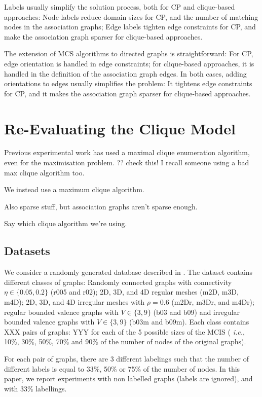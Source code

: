 \documentclass{llncs}
\begin{document}
Labels usually simplify the solution process, both for CP and clique-based approaches: Node labels
reduce domain sizes for CP, and the number of matching nodes in the association graphs; Edge labels
tighten edge constraints for CP, and make the association graph sparser for clique-based approaches.

The extension of MCS algorithms to directed graphs is straightforward: For CP, edge orientation is
handled in edge constraints; for clique-based approaches, it is handled in the definition of the
association graph edges. In both cases, adding orientations to edges usually simplifies the problem:
It tightens edge constraints for CP, and it makes the association graph sparser for  clique-based
approaches.

\section{Re-Evaluating the Clique Model}\label{eval1}

Previous experimental work has used a maximal clique enumeration algorithm, even for the
maximisation problem. ?? check this! I recall someone using a bad max clique algorithm too.
\cite{DBLP:conf/sspr/BunkeFGSV02,DBLP:journals/jgaa/ConteFV07}

We instead use a maximum clique algorithm.

Also sparse stuff, but association graphs aren't sparse enough.

Say which clique algorithm we're using.


\subsection{Datasets}

We consider a randomly generated database described in
\cite{DBLP:journals/prl/SantoFSV03,DBLP:journals/jgaa/ConteFV07}.
The dataset contains different classes of graphs: Randomly connected graphs with connectivity
$\eta\in\{0.05,0.2\}$ (r005 and r02); 2D, 3D, and 4D regular meshes (m2D, m3D, m4D); 2D, 3D, and 4D
irregular meshes with $\rho=0.6$ (m2Dr, m3Dr, and m4Dr); regular bounded valence graphs with
$V\in\{3,9\}$ (b03 and b09) and irregular bounded valence graphs with $V\in\{3,9\}$ (b03m and b09m).
Each class contains XXX pairs of graphs: YYY for each of the 5 possible sizes of the MCIS ({\em
i.e.}, 10\%, 30\%, 50\%, 70\% and 90\% of the number of nodes of the original graphs).

For each pair of graphs, there are 3 different labelings such that the number of different labels is
equal to 33\%, 50\% or 75\% of the number of nodes. In this paper, we report experiments with non
labelled graphs (labels are ignored), and with 33\% labellings.
\end{document}
